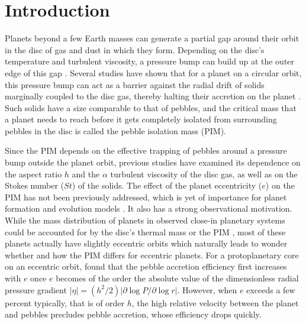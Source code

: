 \documentclass[fleqn,usenatbib]{mnras}
\providecommand{\abs}[1]{\lvert#1\rvert}
\begin{document}
\section{Introduction}
Planets beyond a few Earth masses can generate a partial gap around their orbit in the disc of gas and dust in which they form. Depending on the disc's temperature and turbulent viscosity, a pressure bump can build up at the outer edge of this gap \citep[e.g.,][]{Crida_etal2006,2006A&A...459L..17P,2015ApJ...807L..11D}. Several studies have shown that for a planet on a circular orbit, this pressure bump can act as a barrier against the radial drift of solids marginally coupled to the disc gas, thereby halting their accretion on the planet \citep{2012A&A...546A..18M,Lambrechts_etal2014,2014A&A...572A.107L,2017AJ....153..222B,Ataiee_etal2018,Bitsch_etal2018}. Such solids have a size comparable to that of pebbles, and the critical mass that a planet needs to reach before it gets completely isolated from surrounding pebbles in the disc is called the pebble isolation mass (PIM).

Since the PIM depends on the effective trapping of pebbles around a pressure bump outside the planet orbit, previous studies have examined its dependence on the aspect ratio $h$ and the $\alpha$ turbulent viscosity of the disc gas, as well as on the Stokes number ($St$) of the solids. The effect of the planet eccentricity ($e$) on the PIM has not been previously addressed, which is yet of importance for planet formation and evolution models \citep[][]{PMID:26289203,2019A&A...627A..83L,2019A&A...623A..88B,2020A&A...643A..66B,2021A&A...650A.116M,Izidoro21}. It also has a strong observational motivation. While the mass distribution of planets in observed close-in planetary systems could be accounted for by the disc's thermal mass \citep[][]{2019ApJ...874...91W} or the PIM \citep[][]{2019A&A...630A..51B}, most of these planets actually have slightly eccentric orbits \citep[][]{2011arXiv1109.2497M,2011ApJS..197....8L,2012ApJ...758...39J,2012ApJ...761...92F,2016PNAS..11311431X,2018ApJ...860..101Z} which naturally leads to wonder whether and how the PIM differs for eccentric planets. For a protoplanetary core on an eccentric orbit, \citet{LO2018} found that the pebble accretion efficiency first increases with $e$ once $e$ becomes of the order the absolute value of the dimensionless radial pressure gradient $\abs{\eta} = (h^2/2) \abs{ \partial\log P / \partial\log r }$. However, when $e$ exceeds a few percent typically, that is of order $h$, the high relative velocity between the planet and pebbles precludes pebble accretion, whose efficiency drops quickly. 
\end{document}
